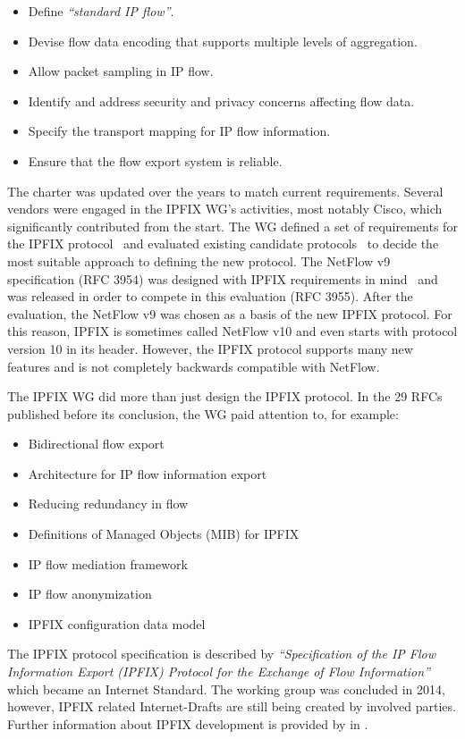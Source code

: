 \begin{itemize}
    \item Define \emph{``standard IP flow''}.
    \item Devise flow data encoding that supports multiple levels of aggregation.
    \item Allow packet sampling in IP flow.
    \item Identify and address security and privacy concerns affecting flow data.
    \item Specify the transport mapping for IP flow information.
    \item Ensure that the flow export system is reliable.
\end{itemize}

The charter was updated over the years to match current requirements. Several vendors were engaged in the IPFIX WG’s activities, most notably Cisco, which significantly contributed from the start. The WG defined a set of requirements for the IPFIX protocol~\cite{rfc3917} and evaluated existing candidate protocols~\cite{rfc3955} to decide the most suitable approach to defining the new protocol. The NetFlow v9 specification (RFC 3954) was designed with IPFIX requirements in mind~\cite{Trammell-2011-Introduction} and was released in order to compete in this evaluation (RFC 3955). After the evaluation, the NetFlow v9 was chosen as a basis of the new IPFIX protocol. For this reason, IPFIX is sometimes called NetFlow v10 and even starts with protocol version 10 in its header. However, the IPFIX protocol supports many new features and is not completely backwards compatible with NetFlow.

The IPFIX WG did more than just design the IPFIX protocol. In the 29 RFCs published before its conclusion, the WG paid attention to, for example:
\begin{itemize}
    \item Bidirectional flow export~\cite{rfc5103}
    \item Architecture for IP flow information export~\cite{rfc5470}
    \item Reducing redundancy in flow~\cite{rfc5473}
    \item Definitions of Managed Objects (MIB) for IPFIX~\cite{rfc5815, rfc6615, rfc8038}
    \item IP flow mediation framework~\cite{rfc5982, rfc6183}
    \item IP flow anonymization~\cite{rfc6235}
    \item IPFIX configuration data model~\cite{rfc6728}
\end{itemize}
The IPFIX protocol specification is described by \emph{``Specification of the IP Flow Information Export (IPFIX) Protocol for the Exchange of Flow Information''}~\cite{rfc7011} which became an Internet Standard. The working group was concluded in 2014, however, IPFIX related Internet-Drafts are still being created by involved parties. Further information about IPFIX development is provided by \citeauthor{Brownlee-2011-Flow} in \cite{Brownlee-2011-Flow}.

